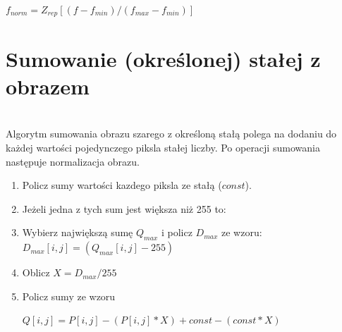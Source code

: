 \documentclass[final,a4paper,openany,12pt]{mwbk}
\begin{document}
	\begin{center}
		$ f_{norm} = Z_{rep}[(f - f_{min}) / (f_{max} - f_{min})] $
	\end{center}

\section {Sumowanie (określonej) stałej z obrazem}
\hfill\\
\indent
Algorytm sumowania obrazu szarego z określoną stałą polega na dodaniu do każdej wartości pojedynczego piksla stałej liczby.
Po operacji sumowania następuje normalizacja obrazu.

	\begin{enumerate}	
		\item Policz sumy wartości kazdego piksla ze stałą ($const$).
		\item Jeżeli jedna z tych sum jest większa niż 255 to:
		\item Wybierz największą sumę  $Q_{max}$ i policz $D_{max}$ ze wzoru: $D_{max}[i,j] = (Q_{max}[i,j] - 255)$ 
		\item Oblicz $X = D_{max} / 255$
		\item Policz sumy ze wzoru
		\begin{center}$Q[i,j] = P[i,j] - (P[i,j]* X) + const - (const * X) $ \\

		\end{center}
	\end{enumerate}
\end{document}
